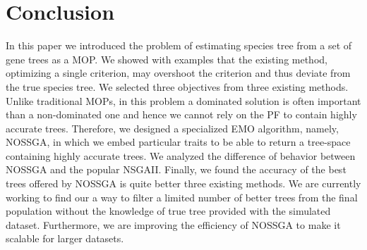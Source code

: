 \section{Conclusion}
In this paper we introduced the problem of estimating species tree from a set of gene trees as a MOP. We showed with examples that the existing method, optimizing a single criterion, may overshoot the criterion and thus deviate from the true species tree. We selected three objectives from three existing methods. Unlike traditional MOPs, in this problem a dominated solution is often important than a non-dominated one and hence we cannot rely on the PF to contain highly accurate trees. Therefore, we designed a specialized EMO algorithm, namely, NOSSGA, in which we embed particular traits to be able to return a tree-space containing highly accurate trees. We analyzed the difference of behavior between NOSSGA and the popular NSGAII. Finally, we found the accuracy of the best trees offered by NOSSGA is quite better three existing methods. We are currently working to find our a way to filter a limited number of better trees from the final population without the knowledge of true tree provided with the simulated dataset. Furthermore, we are improving the efficiency of NOSSGA to make it scalable for larger datasets. 